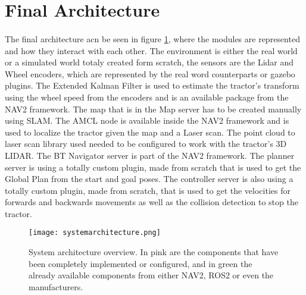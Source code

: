 \section{Final Architecture}
\label{sec:final_architecture}

\paragraph{}The final architecture acn be seen in figure \ref{fig:system_architecture}, 
where the modules are represented and how they interact with each other. The environment is either 
the real world or a simulated world totaly created form scratch, the sensors are the Lidar and Wheel encoders, 
which are represented by the real word counterparts or gazebo plugins. The Extended Kalman Filter is 
used to estimate the tractor's transform using the wheel speed from the encoders and is an available 
package from the \gls{NAV2} framework. The map that is in the Map server has to be created manually using 
\gls{SLAM}. The \gls{AMCL} node is available inside the \gls{NAV2} framework and is used to localize the tractor given the map and a Laser scan. 
The point cloud to laser scan library used needed to be configured to work with the tractor's 3D LIDAR. 
The BT Navigator server is part of the \gls{NAV2} framework. The planner server is using a totally 
custom plugin, made from scratch that is used to get the Global Plan from the start and goal poses. The 
controller server is also using a totally custom plugin, made from scratch, that is used to get 
the velocities for forwards and backwards movements as well as the collision detection to stop the tractor. 



\begin{figure}[h]
    \centering
    \texttt{[image: systemarchitecture.png]}
    \caption{System architecture overview. In pink are the components that have been completely implemented or configured, and in green the already available components from either NAV2, ROS2 or even the manufacturers.}
    \label{fig:system_architecture}
\end{figure}
